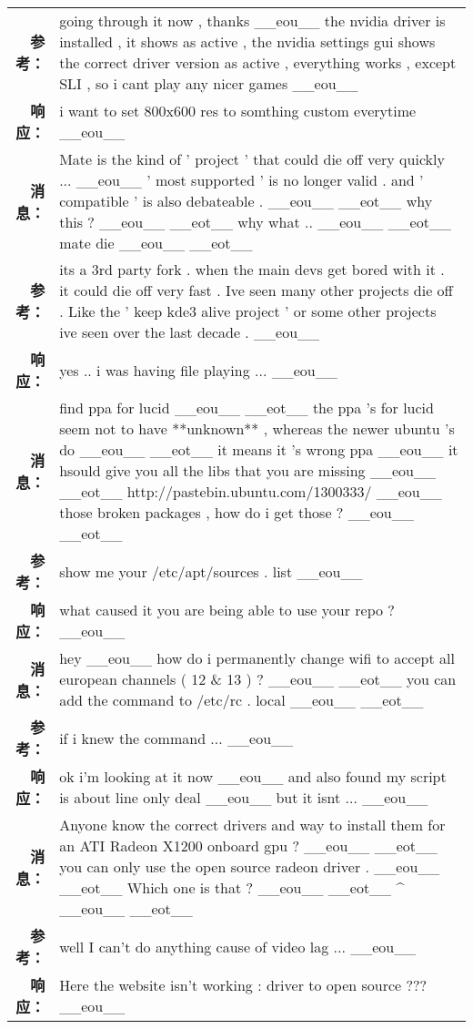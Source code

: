 \begin{tabularx}{\textwidth}{@{}rX@{}}
\textbf{参考：}&going through it now , thanks \_\_eou\_\_ the nvidia driver is installed , it shows as active , the nvidia settings gui shows the correct driver version as active , everything works , except SLI , so i cant play any nicer games \_\_eou\_\_\\%
\textbf{响应：}&i want to set 800x600 res to somthing custom everytime \_\_eou\_\_\\%
\midrule%
\textbf{消息：}&Mate is the kind of ' project ' that could die off very quickly ... \_\_eou\_\_ ' most supported ' is no longer valid . and ' compatible ' is also debateable . \_\_eou\_\_ \_\_eot\_\_ why this ? \_\_eou\_\_ \_\_eot\_\_ why what .. \_\_eou\_\_ \_\_eot\_\_ mate die \_\_eou\_\_ \_\_eot\_\_\\%
\textbf{参考：}&its a 3rd party fork . when the main devs get bored with it . it could die off very fast . Ive seen many other projects die off . Like the ' keep kde3 alive project ' or some other projects ive seen over the last decade . \_\_eou\_\_\\%
\textbf{响应：}&yes .. i was having file playing ... \_\_eou\_\_\\%
\midrule%
\textbf{消息：}&find ppa for lucid \_\_eou\_\_ \_\_eot\_\_ the ppa 's for lucid seem not to have **unknown** , whereas the newer ubuntu 's do \_\_eou\_\_ \_\_eot\_\_ it means it 's wrong ppa \_\_eou\_\_ it hsould give you all the libs that you are missing \_\_eou\_\_ \_\_eot\_\_ http://pastebin.ubuntu.com/1300333/ \_\_eou\_\_ those broken packages , how do i get those ? \_\_eou\_\_ \_\_eot\_\_\\%
\textbf{参考：}&show me your /etc/apt/sources . list \_\_eou\_\_\\%
\textbf{响应：}&what caused it you are being able to use your repo ? \_\_eou\_\_\\%
\midrule%
\textbf{消息：}&hey \_\_eou\_\_ how do i permanently change wifi to accept all european channels ( 12 \& 13 ) ? \_\_eou\_\_ \_\_eot\_\_ you can add the command to /etc/rc . local \_\_eou\_\_ \_\_eot\_\_\\%
\textbf{参考：}&if i knew the command ... \_\_eou\_\_\\%
\textbf{响应：}&ok i'm looking at it now \_\_eou\_\_ and also found my script is about line only deal \_\_eou\_\_ but it isnt ... \_\_eou\_\_\\%
\midrule%
\textbf{消息：}&Anyone know the correct drivers and way to install them for an ATI Radeon X1200 onboard gpu ? \_\_eou\_\_ \_\_eot\_\_ you can only use the open source radeon driver . \_\_eou\_\_ \_\_eot\_\_ Which one is that ? \_\_eou\_\_ \_\_eot\_\_ \^{} \_\_eou\_\_ \_\_eot\_\_\\%
\textbf{参考：}&well I can't do anything cause of video lag ... \_\_eou\_\_\\%
\textbf{响应：}&Here the website isn't working : driver to open source ??? \_\_eou\_\_\\%
\midrule\bottomrule%
%
\end{tabularx}